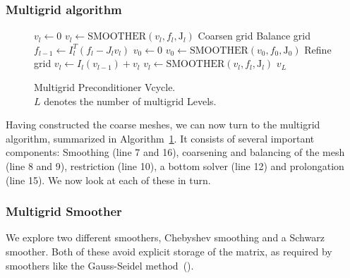 \subsubsection{Multigrid algorithm}
\begin{figure}[ht!]
  \begin{algorithm}[H]
    \caption{\label{alg:Multigrid_Vcycle}
      Multigrid Preconditioner Vcycle.\\
      $L$ denotes the number of multigrid Levels.}
    \begin{algorithmic}[1]
      \State $v_l \leftarrow 0$
      \State $v_l \leftarrow \text{SMOOTHER}(v_l,f_l,\mathrm{J}_l)$ 
      \State Coarsen grid
      \State Balance grid
      \State $f_{l-1} \leftarrow I_l^T(f_l - J_lv_l)$ 
      \EndFor
      \State $v_0 \leftarrow 0$
      \State $v_0 \leftarrow \text{SMOOTHER}(v_0,f_0,\mathrm{J}_0)$ 
      \State Refine grid
      \State $v_l \leftarrow I_l(v_{l-1}) + v_{l}$ 
      \State $v_l \leftarrow \text{SMOOTHER}(v_l,f_l,\mathrm{J}_l)$ 
      \EndFor
      \State \Return $v_L$
      \EndFunction
    \end{algorithmic}
  \end{algorithm}
\end{figure}
%
%
Having constructed the coarse meshes, we can now turn to the
  multigrid algorithm, summarized in
  Algorithm~\ref{alg:Multigrid_Vcycle}.  It consists of several
  important components: Smoothing (line 7 and 16), coarsening and
  balancing of the mesh (line 8 and 9), restriction (line 10), a
  bottom solver (line 12) and prolongation (line 15). We now look
  at each of these in turn.
%
%
%
\subsubsection{Multigrid Smoother}
%
We explore two different smoothers, Chebyshev smoothing and a Schwarz smoother.  Both of these avoid explicit storage of the matrix, as required by smoothers like the Gauss-Seidel method~(\cite{shang2009distributed}).

